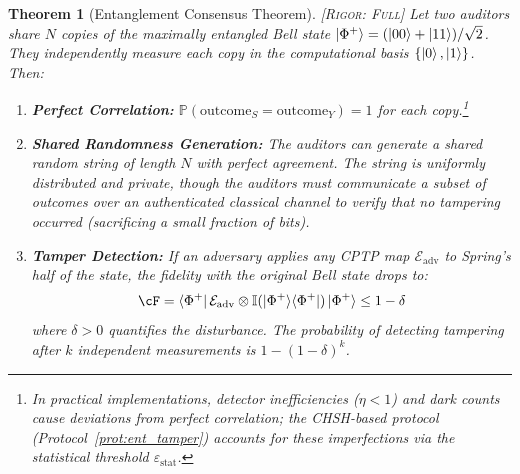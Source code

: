 \documentclass[11pt,a4paper]{article}
\theoremstyle{plain}
\newtheorem{theorem}{Theorem}[section]
\theoremstyle{definition}
\theoremstyle{remark}
\newcommand{\Pbb}{\mathbb{P}}
\newcommand{\cE}{\mathcal{E}}
\newcommand{\id}{\mathbb{I}}
\newcommand{\ketbra}[2]{\ket{#1}\!\bra{#2}}
\newcommand{\bell}[0]{\ket{\Phi^{+}}}
\newcommand{\rigorFull}{\textsc{[Rigor: Full]}}
\begin{document}
\begin{theorem}[Entanglement Consensus Theorem]
\label{thm:ent_consensus}
\rigorFull
Let two auditors share $N$ copies of the maximally entangled Bell state
$\bell = (\ket{00} + \ket{11})/\sqrt{2}$. They independently measure each
copy in the computational basis $\{\ket{0}, \ket{1}\}$. Then:
\begin{enumerate}[label=(\roman*)]
  \item \textbf{Perfect Correlation:}
        $\Pbb(\text{outcome}_S = \text{outcome}_Y) = 1$ for each copy.\footnote{%
        In practical implementations, detector inefficiencies ($\eta < 1$) and
        dark counts cause deviations from perfect correlation; the CHSH-based
        protocol (Protocol~\ref{prot:ent_tamper}) accounts for these
        imperfections via the statistical threshold $\varepsilon_{\text{stat}}$.}
  
  \item \textbf{Shared Randomness Generation:} The auditors can generate
        a shared random string of length $N$ with perfect agreement.
        The string is uniformly distributed and private, though the
        auditors must communicate a subset of outcomes over an
        authenticated classical channel to verify that no tampering
        occurred (sacrificing a small fraction of bits).
  
  \item \textbf{Tamper Detection:} If an adversary applies any CPTP map
        $\cE_{\text{adv}}$ to Spring's half of the state, the fidelity
        with the original Bell state drops to:
        \[
        \cF = \bra{\Phi^+}\cE_{\text{adv}} \otimes \id(\ketbra{\Phi^+}{\Phi^+})
        \ket{\Phi^+} \leq 1 - \delta
        \]
        where $\delta > 0$ quantifies the disturbance.
        The probability of detecting tampering after $k$ independent
        measurements is $1 - (1-\delta)^k$.
\end{enumerate}
\end{theorem}
\end{document}
